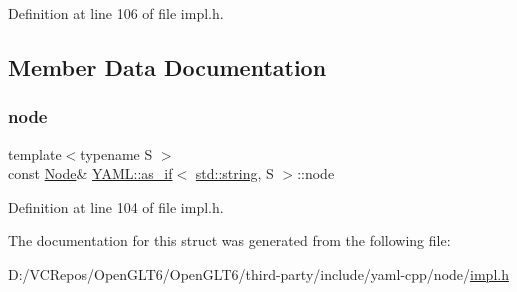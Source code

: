 Definition at line 106 of file impl.\+h.



\subsection{Member Data Documentation}
\mbox{\label{struct_y_a_m_l_1_1as__if_3_01std_1_1string_00_01_s_01_4_ae4be7b0dcee5188473b42e7e14123d38}} 
\subsubsection{\texorpdfstring{node}{node}}
{\footnotesize\ttfamily template$<$typename S $>$ \\
const \mbox{\hyperlink{class_y_a_m_l_1_1_node}{Node}}\& \mbox{\hyperlink{struct_y_a_m_l_1_1as__if}{Y\+A\+M\+L\+::as\+\_\+if}}$<$ \mbox{\hyperlink{glad_8h_ac83513893df92266f79a515488701770}{std\+::string}}, S $>$\+::node}



Definition at line 104 of file impl.\+h.



The documentation for this struct was generated from the following file\+:\begin{DoxyCompactItemize}
\item 
D\+:/\+V\+C\+Repos/\+Open\+G\+L\+T6/\+Open\+G\+L\+T6/third-\/party/include/yaml-\/cpp/node/\mbox{\hyperlink{impl_8h}{impl.\+h}}\end{DoxyCompactItemize}

